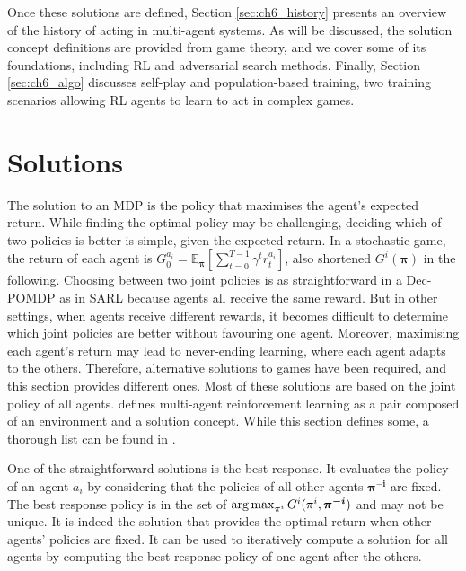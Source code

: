 Once these solutions are defined, Section \ref{sec:ch6_history} presents an overview of the history of acting in multi-agent systems.
As will be discussed, the solution concept definitions are provided from game theory, and we cover some of its foundations, including RL and adversarial search methods.
Finally, Section \ref{sec:ch6_algo} discusses self-play and population-based training, two training scenarios allowing RL agents to learn to act in complex games.

\section{Solutions}\label{sec:ch6_solutions}
The solution to an MDP is the policy that maximises the agent's expected return.
While finding the optimal policy may be challenging, deciding which of two policies is better is simple, given the expected return.
In a stochastic game, the return of each agent is $G_0^{a_i} = \mathbb{E}_{\mathbf{\pi}}\left[ \sum_{t=0}^{T-1} \gamma^t r^{a_i}_t \right]$, also shortened $G^i(\mathbf{\pi})$ in the following.
Choosing between two joint policies is as straightforward in a Dec-POMDP as in SARL because agents all receive the same reward.
But in other settings, when agents receive different rewards, it becomes difficult to determine which joint policies are better without favouring one agent.
Moreover, maximising each agent's return may lead to never-ending learning, where each agent adapts to the others.
Therefore, alternative solutions to games have been required, and this section provides different ones.
Most of these solutions are based on the joint policy of all agents.
\cite{marl-book} defines multi-agent reinforcement learning as a pair composed of an environment and a solution concept.
While this section defines some, a thorough list can be found in \citep{marl-book}.

One of the straightforward solutions is the best response.
It evaluates the policy of an agent $a_i$ by considering that the policies of all other agents $\mathbf{\pi^{-i}}$ are fixed.
The best response policy is in the set of $\argmax_{\pi^{i}} G^i (\pi^{i}, \mathbf{\pi^{-i}})$ and may not be unique.
It is indeed the solution that provides the optimal return when other agents' policies are fixed.
It can be used to iteratively compute a solution for all agents by computing the best response policy of one agent after the others.

